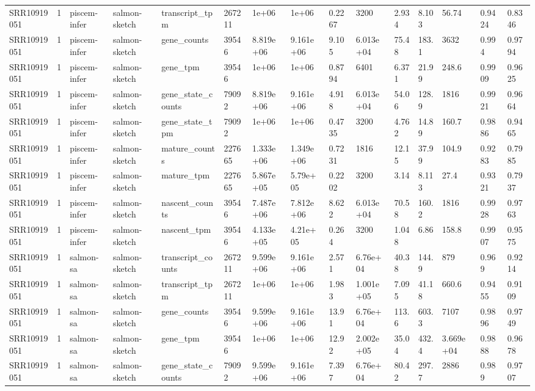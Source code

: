\begin{tabular}{lllllllllllllll}
SRR10919051 & 1 & piscem-infer & salmon-sketch & transcript\_tpm & 267211 & 1e+06 & 1e+06 & 0.2267 & 3200 & 2.934 & 8.103 & 56.74 & 0.9424 & 0.8346 \\
SRR10919051 & 1 & piscem-infer & salmon-sketch & gene\_counts & 39546 & 8.819e+06 & 9.161e+06 & 9.105 & 6.013e+04 & 75.48 & 183.1 & 3632 & 0.994 & 0.9794 \\
SRR10919051 & 1 & piscem-infer & salmon-sketch & gene\_tpm & 39546 & 1e+06 & 1e+06 & 0.8794 & 6401 & 6.371 & 21.99 & 248.6 & 0.9909 & 0.9625 \\
SRR10919051 & 1 & piscem-infer & salmon-sketch & gene\_state\_counts & 79092 & 8.819e+06 & 9.161e+06 & 4.918 & 6.013e+04 & 54.06 & 128.9 & 1816 & 0.9921 & 0.9664 \\
SRR10919051 & 1 & piscem-infer & salmon-sketch & gene\_state\_tpm & 79092 & 1e+06 & 1e+06 & 0.4735 & 3200 & 4.762 & 14.89 & 160.7 & 0.9886 & 0.9465 \\
SRR10919051 & 1 & piscem-infer & salmon-sketch & mature\_counts & 227665 & 1.333e+06 & 1.349e+06 & 0.7231 & 1816 & 12.15 & 37.99 & 104.9 & 0.9283 & 0.7985 \\
SRR10919051 & 1 & piscem-infer & salmon-sketch & mature\_tpm & 227665 & 5.867e+05 & 5.79e+05 & 0.2202 & 3200 & 3.14 & 8.113 & 27.4 & 0.9321 & 0.7937 \\
SRR10919051 & 1 & piscem-infer & salmon-sketch & nascent\_counts & 39546 & 7.487e+06 & 7.812e+06 & 8.622 & 6.013e+04 & 70.58 & 160.2 & 1816 & 0.9928 & 0.9763 \\
SRR10919051 & 1 & piscem-infer & salmon-sketch & nascent\_tpm & 39546 & 4.133e+05 & 4.21e+05 & 0.264 & 3200 & 1.048 & 6.86 & 158.8 & 0.9907 & 0.9575 \\
SRR10919051 & 1 & salmon-sa & salmon-sketch & transcript\_counts & 267211 & 9.599e+06 & 9.161e+06 & 2.571 & 6.76e+04 & 40.38 & 144.9 & 879 & 0.969 & 0.9214 \\
SRR10919051 & 1 & salmon-sa & salmon-sketch & transcript\_tpm & 267211 & 1e+06 & 1e+06 & 1.983 & 1.001e+05 & 7.095 & 41.18 & 660.6 & 0.9455 & 0.9109 \\
SRR10919051 & 1 & salmon-sa & salmon-sketch & gene\_counts & 39546 & 9.599e+06 & 9.161e+06 & 13.91 & 6.76e+04 & 113.6 & 603.3 & 7107 & 0.9896 & 0.9749 \\
SRR10919051 & 1 & salmon-sa & salmon-sketch & gene\_tpm & 39546 & 1e+06 & 1e+06 & 12.92 & 2.002e+05 & 35.04 & 432.4 & 3.669e+04 & 0.9888 & 0.9678 \\
SRR10919051 & 1 & salmon-sa & salmon-sketch & gene\_state\_counts & 79092 & 9.599e+06 & 9.161e+06 & 7.397 & 6.76e+04 & 80.42 & 297.7 & 2886 & 0.989 & 0.9707 \\

\end{tabular}
